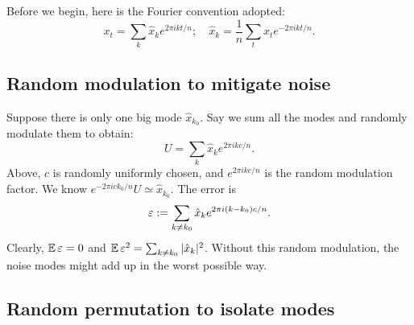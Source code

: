 \documentclass[10pt]{article}
\begin{document}
Before we begin, here is the Fourier convention adopted:
$$x_t = \sum_k \hat{x}_k e^{2\pi i kt/n}; \quad \hat{x}_k =\frac{1}{n} \sum_t x_t e^{-2\pi i k t/n}.$$

\subsection{Random modulation to mitigate noise}

Suppose there is only one big mode $\hat{x}_{k_0}$. Say we sum all the modes and randomly modulate them to obtain:
$$U = \sum_k \hat{x}_{k} e^{2\pi i k c/n}.$$
Above, $c$ is randomly uniformly chosen, and $e^{2\pi i kc/n}$ is the random modulation factor. We know $e^{-2\pi i ck_0/n}U \simeq \hat{x}_{k_0}$. The error is
$$\operatorname{\varepsilon}:=\sum_{k\neq k_0} \hat{x}_k e^{2\pi i (k-k_0)c/n}.$$
Clearly, $\operatorname{\mathbb{E}} \operatorname{\varepsilon} = 0$ and $\operatorname{\mathbb{E}} \operatorname{\varepsilon}^2 = \sum_{k\neq k_0} |\hat{x}_k|^2$. Without this random modulation, the noise modes might add up in the worst possible way.

\subsection{Random permutation to isolate modes}
\end{document}
